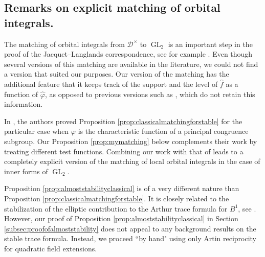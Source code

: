 \documentclass{article}
\theoremstyle{named}
\newcommand{\D}{\mathcal{D}}
\newcommand{\Z}{\mathbb{Z}}
\DeclareMathOperator{\SL}{SL}
\DeclareMathOperator{\GL}{GL}
\begin{document}
\subsection{Remarks on explicit matching of orbital integrals.}
The matching of orbital integrals from $\D^\times$ to $\GL_2$ is an important step in the proof of the Jacquet--Langlands correspondence, see for example \cite[Section 8]{corvallisgelbartjacquet}. Even though several versions of this matching are available in the literature, we could not find a version that suited our purposes. Our version of the matching has the additional feature that it keeps track of the support and the level of $\widehat{f}$ as a function of $\widehat{\varphi}$, as opposed to previous versions such as \cite[Lemma 8.10]{corvallisgelbartjacquet}, which do not retain this information.


In \cite{tang2025}, the authors proved Proposition \ref{prop:classicalmatchingforstable} for the particular case when $\varphi$ is the characteristic function of a principal congruence subgroup. Our Proposition \ref{prop:mymatching} below complements their work by treating different test functions. Combining our work with that of \cite{tang2025} leads to a completely explicit version of the matching of local orbital integrals in the case of inner forms of $\GL_2$. 

Proposition \ref{prop:almoststabilityclassical} is of a very different nature than Proposition \ref{prop:classicalmatchingforstable}. It is closely related to the stabilization of the elliptic contribution to the Arthur trace formula for $B^1$, see \cite{Labesse_Langlands_1979}. However, our proof of Proposition \ref{prop:almoststabilityclassical} in Section \ref{subsec:proofofalmoststability} does not appeal to any background results on the stable trace formula. Instead, we proceed ``by hand" using only Artin reciprocity for quadratic field extensions. 

\end{document}
